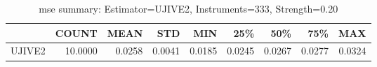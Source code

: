 \begin{table}[ht]
\centering
\caption{mse summary: Estimator=UJIVE2, Instruments=333, Strength=0.20}
\begin{tabular}{lrrrrrrrr}
\toprule
 & COUNT & MEAN & STD & MIN & 25\% & 50\% & 75\% & MAX \\
\midrule
UJIVE2 & 10.0000 & 0.0258 & 0.0041 & 0.0185 & 0.0245 & 0.0267 & 0.0277 & 0.0324 \\
\bottomrule
\end{tabular}
\end{table}
